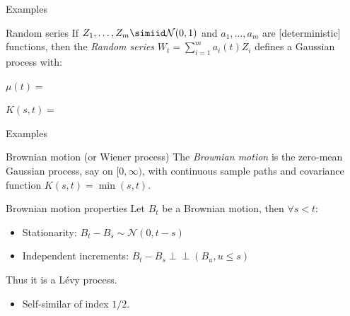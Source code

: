 \begin{frame}{Examples}
\begin{exampleblock}{Random series}
	If $Z_1,\ldots,Z_m\simiid \mathcal{N}(0,1)$ and $a_1,\ldots,a_m$ are [deterministic] functions, then the \textit{Random series} $W_t = \sum_{i=1}^m a_i(t)Z_i$ defines a Gaussian process with:\bigskip
	
		\indent $\mu(t)=$\bigskip
		
		\indent $K(s, t)=$
\end{exampleblock}

\end{frame}


\begin{frame}{Examples}

\begin{exampleblock}{Brownian motion (or Wiener process)}
	The \textit{Brownian motion} is the zero-mean Gaussian process, say on $[0,\infty)$, with continuous sample paths and covariance function $K(s,t)=\min(s,t)$.
\end{exampleblock}

\pause


\begin{alertblock}{Brownian motion properties}
	Let $B_t$ be a Brownian motion, then $\forall s< t$:
	\begin{itemize}
		\item \alert{Stationarity}:  $B_t-B_s\sim \mathcal{N}(0,t-s)$
		\item \alert{Independent increments}:  $B_t-B_s \perp\!\!\!\!\perp (B_u, u\leq s)$
	\end{itemize}
	Thus it is a L\'evy process.
	\begin{itemize}
		\item \alert{Self-similar} of index $1/2$.
	\end{itemize}
\end{alertblock}

\end{frame}


